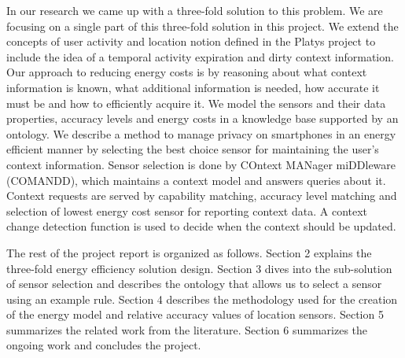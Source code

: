 \documentclass{ubicomp2013}
\begin{document}
In our research we came up with a three-fold solution to this problem. We are focusing on a single part of this three-fold solution in this project. We extend the concepts of user activity and location notion defined in the Platys project to include the idea of a temporal activity expiration and dirty context information. Our approach to reducing energy costs is by reasoning about what context information is known, what additional information is needed, how accurate it must be and how to efficiently acquire it. We model the sensors and their data properties, accuracy levels and energy costs in a knowledge base supported by an ontology. We describe a method to manage privacy on smartphones in an energy efficient manner by selecting the best choice sensor for maintaining the user's context information. Sensor selection is done by COntext MANager miDDleware (COMANDD), which maintains a context model and answers queries about it. Context requests are served by capability matching, accuracy level matching and selection of lowest energy cost sensor for reporting context data. A context change detection function is used to decide when the context should be updated.

The rest of the project report is organized as follows. Section 2 explains the three-fold energy efficiency solution design. Section 3 dives into the sub-solution of sensor selection and describes the ontology that allows us to select a sensor using an example rule. Section 4 describes the methodology used for the creation of the energy model and relative accuracy values of location sensors. Section 5 summarizes the related work from the literature. Section 6 summarizes the ongoing work and concludes the project. 
\end{document}
